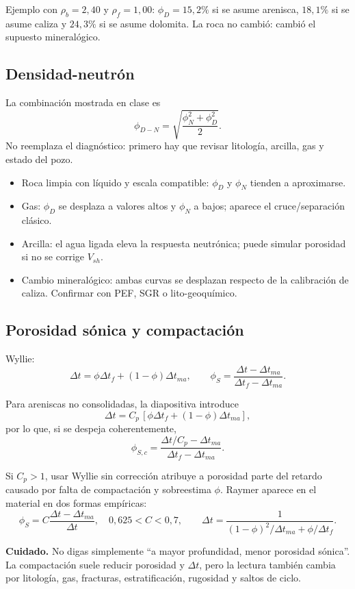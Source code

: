 \documentclass[10.5pt,a4paper]{article}
\newcommand{\cuidado}[1]{\par\textcolor{rojo}{\textbf{Cuidado.} #1}\par}
\begin{document}
Ejemplo con $\rho_b=2{,}40$ y $\rho_f=1{,}00$: $\phi_D=15{,}2\%$ si se asume arenisca, $18{,}1\%$ si se asume caliza y $24{,}3\%$ si se asume dolomita. La roca no cambi\'o: cambi\'o el supuesto mineral\'ogico.

\subsection{Densidad-neutr\'on}

La combinaci\'on mostrada en clase es
\[
\boxed{\phi_{D-N}=\sqrt{\frac{\phi_N^2+\phi_D^2}{2}}}.
\]
No reemplaza el diagn\'ostico: primero hay que revisar litolog\'ia, arcilla, gas y estado del pozo.

\begin{itemize}
  \item Roca limpia con l\'iquido y escala compatible: $\phi_D$ y $\phi_N$ tienden a aproximarse.
  \item Gas: $\phi_D$ se desplaza a valores altos y $\phi_N$ a bajos; aparece el cruce/separaci\'on cl\'asico.
  \item Arcilla: el agua ligada eleva la respuesta neutr\'onica; puede simular porosidad si no se corrige $V_{sh}$.
  \item Cambio mineral\'ogico: ambas curvas se desplazan respecto de la calibraci\'on de caliza. Confirmar con PEF, SGR o lito-geoqu\'imico.
\end{itemize}

\subsection{Porosidad s\'onica y compactaci\'on}

Wyllie:
\[
\Delta t=\phi\Delta t_f+(1-\phi)\Delta t_{ma},
\qquad
\boxed{\phi_S=\frac{\Delta t-\Delta t_{ma}}{\Delta t_f-\Delta t_{ma}}}.
\]

Para areniscas no consolidadas, la diapositiva introduce
\[
\Delta t=C_p\,[\phi\Delta t_f+(1-\phi)\Delta t_{ma}],
\]
por lo que, si se despeja coherentemente,
\[
\boxed{\phi_{S,c}=\frac{\Delta t/C_p-\Delta t_{ma}}{\Delta t_f-\Delta t_{ma}}}.
\]

Si $C_p>1$, usar Wyllie sin correcci\'on atribuye a porosidad parte del retardo causado por falta de compactaci\'on y sobreestima $\phi$. Raymer aparece en el material en dos formas emp\'iricas:
\[
\phi_S=C\frac{\Delta t-\Delta t_{ma}}{\Delta t},\quad 0{,}625<C<0{,}7,
\qquad
\Delta t=\frac{1}{(1-\phi)^2/\Delta t_{ma}+\phi/\Delta t_f}.
\]

\cuidado{No digas simplemente ``a mayor profundidad, menor porosidad s\'onica''. La compactaci\'on suele reducir porosidad y $\Delta t$, pero la lectura tambi\'en cambia por litolog\'ia, gas, fracturas, estratificaci\'on, rugosidad y saltos de ciclo.}
\end{document}
